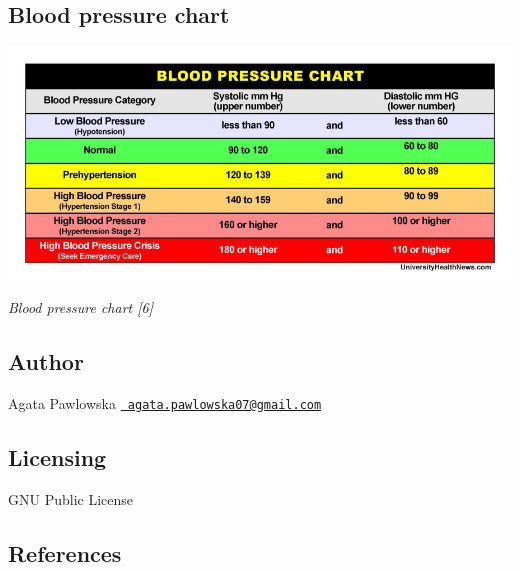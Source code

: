 \subsection*{Blood pressure chart}


\begin{DoxyImage}
\includegraphics[width=\textwidth,height=\textheight/2,keepaspectratio=true]{blood-pressure-chart.png}
\end{DoxyImage}
 {\itshape  Blood pressure chart \mbox{[}6\mbox{]} }~\newline


\subsection*{Author}

Agata Pawlowska \href{mailto:agata.pawlowska07@gmail.com}{\texttt{ agata.\+pawlowska07@gmail.\+com}}

\subsection*{Licensing}

G\+NU Public License

\subsection*{References}


